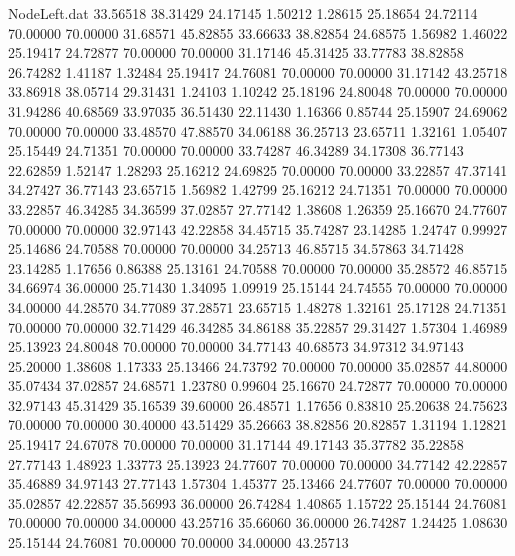 \begin{filecontents}{NodeLeft.dat}
  33.56518   38.31429   24.17145     1.50212    1.28615   25.18654   24.72114   70.00000   70.00000   31.68571   45.82855
  33.66633   38.82854   24.68575     1.56982    1.46022   25.19417   24.72877   70.00000   70.00000   31.17146   45.31425
  33.77783   38.82858   26.74282     1.41187    1.32484   25.19417   24.76081   70.00000   70.00000   31.17142   43.25718
  33.86918   38.05714   29.31431     1.24103    1.10242   25.18196   24.80048   70.00000   70.00000   31.94286   40.68569
  33.97035   36.51430   22.11430     1.16366    0.85744   25.15907   24.69062   70.00000   70.00000   33.48570   47.88570
  34.06188   36.25713   23.65711     1.32161    1.05407   25.15449   24.71351   70.00000   70.00000   33.74287   46.34289
  34.17308   36.77143   22.62859     1.52147    1.28293   25.16212   24.69825   70.00000   70.00000   33.22857   47.37141
  34.27427   36.77143   23.65715     1.56982    1.42799   25.16212   24.71351   70.00000   70.00000   33.22857   46.34285
  34.36599   37.02857   27.77142     1.38608    1.26359   25.16670   24.77607   70.00000   70.00000   32.97143   42.22858
  34.45715   35.74287   23.14285     1.24747    0.99927   25.14686   24.70588   70.00000   70.00000   34.25713   46.85715
  34.57863   34.71428   23.14285     1.17656    0.86388   25.13161   24.70588   70.00000   70.00000   35.28572   46.85715
  34.66974   36.00000   25.71430     1.34095    1.09919   25.15144   24.74555   70.00000   70.00000   34.00000   44.28570
  34.77089   37.28571   23.65715     1.48278    1.32161   25.17128   24.71351   70.00000   70.00000   32.71429   46.34285
  34.86188   35.22857   29.31427     1.57304    1.46989   25.13923   24.80048   70.00000   70.00000   34.77143   40.68573
  34.97312   34.97143   25.20000     1.38608    1.17333   25.13466   24.73792   70.00000   70.00000   35.02857   44.80000
  35.07434   37.02857   24.68571     1.23780    0.99604   25.16670   24.72877   70.00000   70.00000   32.97143   45.31429
  35.16539   39.60000   26.48571     1.17656    0.83810   25.20638   24.75623   70.00000   70.00000   30.40000   43.51429
  35.26663   38.82856   20.82857     1.31194    1.12821   25.19417   24.67078   70.00000   70.00000   31.17144   49.17143
  35.37782   35.22858   27.77143     1.48923    1.33773   25.13923   24.77607   70.00000   70.00000   34.77142   42.22857
  35.46889   34.97143   27.77143     1.57304    1.45377   25.13466   24.77607   70.00000   70.00000   35.02857   42.22857
  35.56993   36.00000   26.74284     1.40865    1.15722   25.15144   24.76081   70.00000   70.00000   34.00000   43.25716
  35.66060   36.00000   26.74287     1.24425    1.08630   25.15144   24.76081   70.00000   70.00000   34.00000   43.25713

\end{filecontents}
